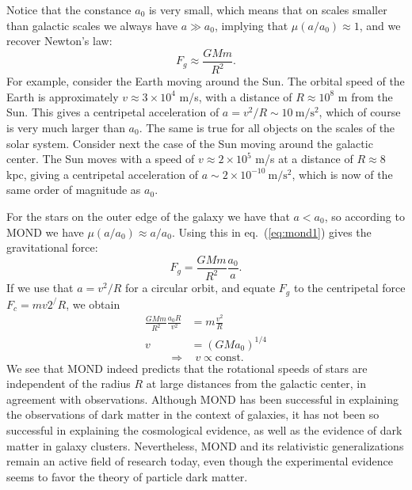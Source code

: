 Notice that the constance $a_0$ is very small, which means that on scales smaller than galactic scales we always have $a\gg a_0$, implying that $\mu(a/a_0)\approx 1$, and we recover Newton's law:
\begin{equation}
F_g\approx \frac{GMm}{R^2}.
\end{equation}
For example, consider the Earth moving around the Sun. The orbital speed of the Earth is approximately $v\approx 3\times10^4$ m/s, with a distance of $R\approx 10^8$ m from the Sun. This gives a centripetal acceleration of $a=v^2/R\sim 10~\mathrm{m/s^2}$, which of course is very much larger than $a_0$. The same is true for all objects on the scales of the solar system. Consider next the case of the Sun moving around the galactic center. The Sun moves with a speed of $v\approx 2\times10^5$ m/s at a distance of $R\approx 8$ kpc, giving a centripetal acceleration of $a\sim 2\times10^{-10}~\mathrm{m/s^2}$, which is now of the same order of magnitude as $a_0$.

For the stars on the outer edge of the galaxy we have that $a<a_0$, so according to MOND we have $\mu(a/a_0)\approx a/a_0$. Using this in eq.\ (\ref{eq:mond1}) gives the gravitational force:
\begin{equation}
F_g = \frac{GMm}{R^2}\frac{a_0}{a}.
\end{equation}
If we use that $a=v^2/R$ for a circular orbit, and equate $F_g$ to the centripetal force $F_c=mv2^/R$, we obtain
\begin{equation}
\begin{split}
\frac{GMm}{R^2}\frac{a_0 R}{v^2}&= m\frac{v^2}{R}\\
v&=\left(GMa_0\right)^{1/4}
\end{split}
\end{equation}
\begin{equation}
\Rightarrow~~~~ v\propto \mathrm{const.}
\end{equation}
We see that MOND indeed predicts that the rotational speeds of stars are independent of the radius $R$ at large distances from the galactic center, in agreement with observations. Although MOND has been successful in explaining the observations of dark matter in the context of galaxies, it has not been so successful in explaining the cosmological evidence, as well as the evidence of dark matter in galaxy clusters. Nevertheless, MOND and its relativistic generalizations remain an active field of research today, even though the experimental evidence seems to favor the theory of particle dark matter.

